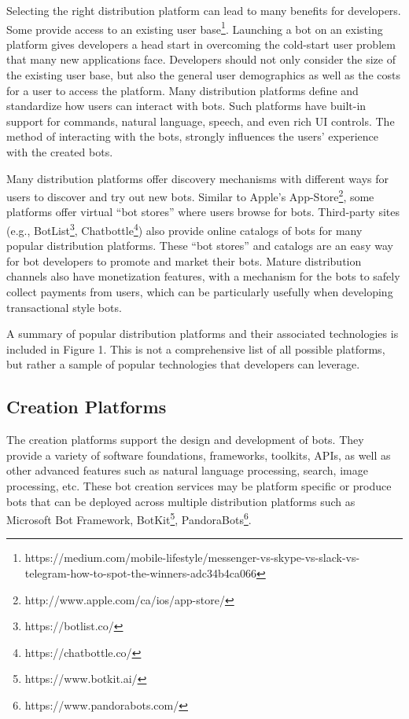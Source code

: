 \documentclass{sig-alternate}
\begin{document}
	Selecting the right distribution platform can lead to many benefits for developers.
	Some provide access to an existing user base\footnote{https://medium.com/mobile-lifestyle/messenger-vs-skype-vs-slack-vs-telegram-how-to-spot-the-winners-adc34b4ca066\label{How_to_spot_the_winners}}.
	Launching a bot on an existing platform gives developers a head start in overcoming the cold-start user problem that many new applications face. 
	Developers should not only consider the size of the existing user base, but also the general user demographics as well as the costs for a user to access the platform.   
	Many distribution platforms define and standardize how users can interact with bots.  Such platforms have built-in support for commands, natural language, speech, and even rich UI controls.  The method of interacting with the bots, strongly influences the users' experience with the created bots.
	
	Many distribution platforms offer discovery mechanisms with different ways for users to discover and try out new bots. Similar to Apple's App-Store\footnote{http://www.apple.com/ca/ios/app-store/}, some platforms offer virtual ``bot stores'' where users browse for bots. Third-party sites (e.g., BotList\footnote{https://botlist.co/}, Chatbottle\footnote{https://chatbottle.co/}) also provide online catalogs of bots for many popular distribution platforms. These ``bot stores'' and catalogs are an easy way for bot developers to promote and market their bots. 
	Mature distribution channels also have monetization features, with a mechanism for the bots to safely collect payments from users, which can be particularly usefully when developing transactional style bots.

	A summary of popular distribution platforms and their associated technologies is included in Figure 1.  This is not a comprehensive list of all possible platforms, but rather a sample of popular technologies that developers can leverage.

	\subsection{Creation Platforms}

	The creation platforms support the design and development of bots. They provide a variety of software foundations, frameworks, toolkits, APIs, as well as other advanced features such as natural language processing, search, image processing, etc. These bot creation services may be platform specific or produce bots that can be deployed across multiple distribution platforms such as Microsoft Bot Framework, BotKit\footnote{https://www.botkit.ai/}, PandoraBots\footnote{https://www.pandorabots.com/}. 
	
\end{document}
